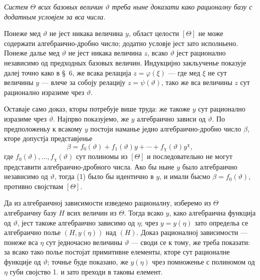 ﻿\documentclass[11pt]{article}
\begin{document}
{\itshape Систем $\Theta$ всих базовых величин $\vartheta$ треба ныне доказати
како рационалну базу с додатным условјем за вса числа.}

Понеже мед $\vartheta$ не јест никака величина $y$, област целости $[\Theta]$
не може содержати алгебраично-дробно число; додатно условје јест зато
исполньено. Понеже далье мед $\vartheta$ не јест никака величина $z$, всако
$\vartheta$ јест рационално независимо од предходных базовых величин.
Индукцијно закльученье показује далеј точно како в \S\ 6, же всака релација
$z=\varphi(\xi)$ --- где мед $\xi$ не сут величины $y$ --- влече за собоју
релацију $z=\psi(\vartheta)$, тако же вса величины $z$ сут рационално изразиме
чрез $\vartheta$.

Оставаје само доказ, кторы потребује више труда: же такоже $y$ сут рационално
изразиме чрез $\vartheta$. Најпрво показујемо, же $y$ алгебраично зависи од
$\vartheta$. По предположеньу к всакому $y$ постоји наманье једно
алгебраично-дробно число $\beta$, кторе допустја представјенье
\begin{equation}
\beta=f_0(\vartheta)+f_1(\vartheta)y+\cdots+f_\chi(\vartheta)y^\chi,
\tag{1}
\end{equation}
где $f_0(\vartheta),\ldots,f_\chi(\vartheta)$ сут полиномы из $[\Theta]$ и
последовательно не могут представити алгебраично-дробного числа. Ако бы ныне
$y$ было алгебраично независимо од $\vartheta$, тогда (1) было бы идентично в
$y$, и имали бысмо $\beta=f_0(\vartheta)$, противно својствам $[\Theta]$.

Да из алгебраичној зависимости изведемо рационалну, изберемо из $\Theta$
алгебраичну базу $H$ всих величин из $\Theta$. Тогда всако $y$, како
алгебраична функција од $\vartheta$, јест такоже алгебраично зависимо од
$\eta$; чрез $y=y(\eta)$ зато определьа се алгебраично полье $(H,y(\eta))$ над
$(H)$. Доказ рационалној зависимости --- понеже вса $\eta$ сут једночасно
величины $\vartheta$ --- своди се к тому, же треба показати: за всако тако полье
постојат примитивне елементы, кторе сут рационалне функције од
$\vartheta$; точнье буде показано, же $y(\eta)$ чрез помноженье с полиномом од
$\eta$ губи својство 1. и зато преходи в таковы елемент.
\end{document}
